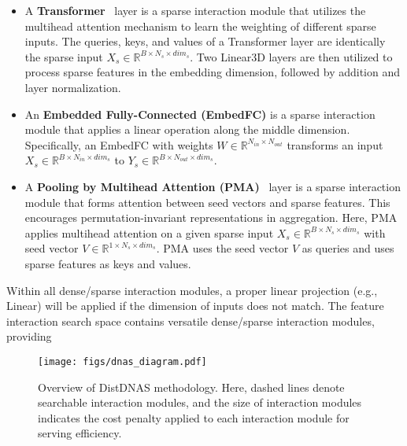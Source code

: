 \begin{itemize}[noitemsep,leftmargin=*]
    \item A \textbf{Transformer}~\cite{vaswani2017attention} layer is a sparse interaction module that utilizes the multihead attention mechanism to learn the weighting of different sparse inputs. 
    The queries, keys, and values of a Transformer layer are identically the sparse input $X_{s} \in \mathbb{R}^{B\times N_s \times dim_{s}}$.
    Two Linear3D layers are then utilized to process sparse features in the embedding dimension, followed by addition and layer normalization.
    
    \item An \textbf{Embedded Fully-Connected (EmbedFC)} is a sparse interaction module that applies a linear operation along the middle dimension. Specifically, an EmbedFC with weights $W \in \mathbb{R}^{N_{in} \times N_{out}}$ transforms an input $X_s \in \mathbb{R}^{B \times N_{in} \times dim_{s}}$ to $Y_s \in \mathbb{R}^{B \times N_{out} \times dim_{s}}$.



    \item A \textbf{Pooling by Multihead Attention (PMA)}~\cite{lee2019set} layer is a sparse interaction module that forms attention between seed vectors and sparse features.
    This encourages permutation-invariant representations in aggregation. 
    Here, PMA applies multihead attention on a given sparse input $X_{s} \in \mathbb{R}^{B\times N_s \times dim_{s}}$ with seed vector $V \in \mathbb{R}^{1 \times N_{s} \times dim_{s}}$. PMA uses the seed vector $V$ as queries and uses sparse features as keys and values.
\end{itemize}

Within all dense/sparse interaction modules, a proper linear projection (e.g., Linear) will be applied if the dimension of inputs does not match. The feature interaction search space contains versatile dense/sparse interaction modules, providing 


\begin{figure*}[t]
    \begin{center}
    \texttt{[image: figs/dnas\_diagram.pdf]}
    \vspace{-1em}
    \caption{Overview of DistDNAS methodology. Here, dashed lines denote searchable interaction modules, and the size of interaction modules indicates the cost penalty applied to each interaction module for serving efficiency.}
    \label{fig:distributed_dnas}
    \end{center}
    \vspace{-1em}
\end{figure*}
